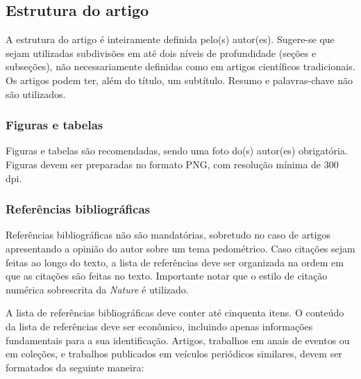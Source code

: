 \subsection{Estrutura do artigo}

A estrutura do artigo é inteiramente definida pelo(s) autor(es). Sugere-se que sejam utilizadas subdivisões em até dois níveis de profundidade (seções e subseções), não necessariamente definidas como em artigos científicos tradicionais. Os artigos podem ter, além do título, um subtítulo. Resumo e palavras-chave não são utilizados.

\subsubsection{Figuras e tabelas}

Figuras e tabelas são recomendadas, sendo uma foto do(s) autor(es) obrigatória. Figuras devem ser preparadas no formato PNG, com resolução mínima de 300 dpi.

\subsubsection{Referências bibliográficas}

Referências bibliográficas não são mandatórias, sobretudo no caso de artigos apresentando a opinião do autor sobre um tema pedométrico. Caso citações sejam feitas ao longo do texto, a lista de referências deve ser organizada na ordem em que as citações são feitas no texto. Importante notar que o estilo de citação numérica sobrescrita da \textit{Nature} é utilizado.

A lista de referências bibliográficas deve conter até cinquenta itens. O conteúdo da lista de referências deve ser econômico, incluindo apenas informações fundamentais para a sua identificação. Artigos, trabalhos em anais de eventos ou em coleções, e trabalhos publicados em veículos periódicos similares, devem ser formatados da seguinte maneira:

\vspace{0.5cm}
\vspace{0.5cm}


